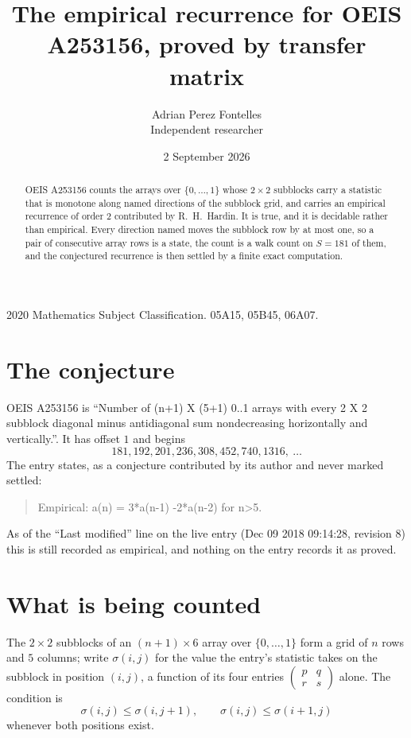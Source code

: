 \documentclass[11pt,a4paper]{article}
\title{The empirical recurrence for OEIS A253156, proved by transfer matrix}
\author{Adrian Perez Fontelles\\ \small Independent researcher}
\date{2 September 2026}
\theoremstyle{plain}
\theoremstyle{definition}
\begin{document}
\maketitle

\begin{abstract}
OEIS A253156 counts the arrays over $\{0,\dots,1\}$ whose $2\times2$ subblocks carry a
statistic that is monotone along named directions of the subblock grid, and carries an
empirical recurrence of order $2$ contributed by R.~H.~Hardin. It is true, and it is
decidable rather than empirical. Every direction named moves the subblock row by at most one,
so a pair of consecutive array rows is a state, the count is a walk count on $S=181$ of them,
and the conjectured recurrence is then settled by a finite exact computation.
\end{abstract}

\noindent\small 2020 Mathematics Subject Classification. 05A15, 05B45, 06A07.\normalsize

\section{The conjecture}

OEIS A253156 is ``Number of (n+1) X (5+1) 0..1 arrays with every 2 X 2 subblock diagonal minus antidiagonal sum nondecreasing horizontally and vertically.''. It has offset $1$ and begins
\[
181, 192, 201, 236, 308, 452, 740, 1316,\ \dots
\]
The entry states, as a conjecture contributed by its author and never marked settled:
\begin{quote}
Empirical: a(n) = 3*a(n-1) -2*a(n-2) for n>5.
\end{quote}
As of the ``Last modified'' line on the live entry (Dec 09 2018 09:14:28, revision 8) this is still
recorded as empirical, and nothing on the entry records it as proved.

\section{What is being counted}

The $2\times2$ subblocks of an $(n+1)\times6$ array over $\{0,\dots,1\}$ form a grid
of $n$ rows and $5$ columns; write $\sigma(i,j)$ for the value the entry's statistic takes on
the subblock in position $(i,j)$, a function of its four entries
$\begin{pmatrix}p&q\\r&s\end{pmatrix}$ alone. The condition is
\[
\sigma(i,j)\le\sigma(i,j+1),\qquad \sigma(i,j)\le\sigma(i+1,j)
\]
whenever both positions exist.
\end{document}
